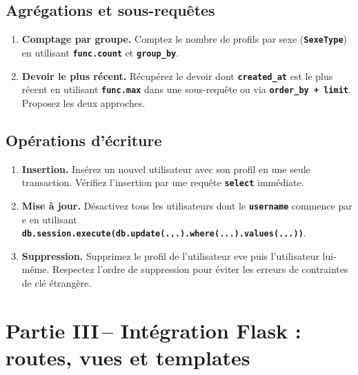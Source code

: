 \documentclass[12pt,a4paper]{article}
\newcommand{\kw}[1]{\texttt{\textbf{#1}}}
\begin{document}
\subsection{Agrégations et sous-requêtes}

\begin{mdframed}[style=exercice]
\begin{enumerate}[label=\textbf{Q\arabic*.},start=15]
    \item \textbf{Comptage par groupe.} Comptez le nombre de profils par sexe (\kw{SexeType}) en utilisant \kw{func.count} et \kw{group\_by}.

    \item \textbf{Devoir le plus récent.} Récupérez le devoir dont \kw{created\_at} est le plus récent en utilisant \kw{func.max} dans une sous-requête ou via \kw{order\_by + limit}. Proposez les deux approches.
\end{enumerate}
\end{mdframed}

\subsection{Opérations d'écriture}

\begin{mdframed}[style=exercice]
\begin{enumerate}[label=\textbf{Q\arabic*.},start=17]
    \item \textbf{Insertion.} Insérez un nouvel utilisateur avec son profil en une seule transaction. Vérifiez l'insertion par une requête \kw{select} immédiate.

    \item \textbf{Mise à jour.} Désactivez tous les utilisateurs dont le \kw{username} commence par \og e \fg{} en utilisant \kw{db.session.execute(db.update(...).where(...).values(...))}.

    \item \textbf{Suppression.} Supprimez le profil de l'utilisateur \og eve \fg{} puis l'utilisateur lui-même. Respectez l'ordre de suppression pour éviter les erreurs de contraintes de clé étrangère.
\end{enumerate}
\end{mdframed}

\section{Partie III\,– Intégration Flask : routes, vues et templates}
\end{document}
